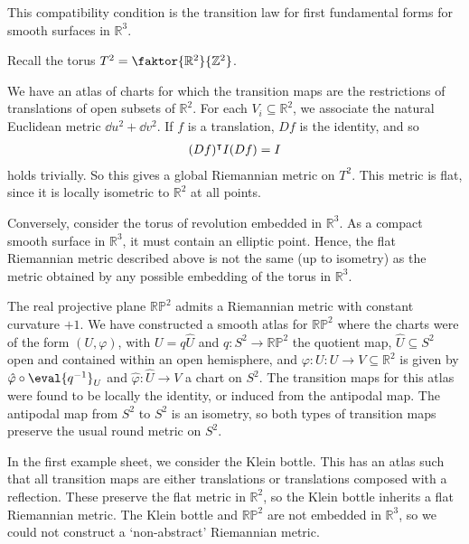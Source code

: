 This compatibility condition is the transition law for first fundamental forms for smooth surfaces in $\mathbb R^3$.
\begin{example}
	Recall the torus $T^2 = \faktor{\mathbb R^2}{\mathbb Z^2}$.
	\begin{center}
	\end{center}
	We have an atlas of charts for which the transition maps are the restrictions of translations of open subsets of $\mathbb R^2$.
	For each $V_i \subseteq \mathbb R^2$, we associate the natural Euclidean metric $\dd{u}^2 + \dd{v}^2$.
	If $f$ is a translation, $Df$ is the identity, and so
	\begin{align*}
		(Df)^\intercal I (Df) = I
	\end{align*}
	holds trivially.
	So this gives a global Riemannian metric on $T^2$.
	This metric is flat, since it is locally isometric to $\mathbb R^2$ at all points.

	Conversely, consider the torus of revolution embedded in $\mathbb R^3$.
	As a compact smooth surface in $\mathbb R^3$, it must contain an elliptic point.
	Hence, the flat Riemannian metric described above is not the same (up to isometry) as the metric obtained by any possible embedding of the torus in $\mathbb R^3$.

	The real projective plane $\mathbb R \mathbb P^2$ admits a Riemannian metric with constant curvature $+1$.
	We have constructed a smooth atlas for $\mathbb R \mathbb P^2$ where the charts were of the form $(U, \varphi)$, with $U = q \hat U$ and $q \colon S^2 \to \mathbb R \mathbb P^2$ the quotient map, $\hat U \subseteq S^2$ open and contained within an open hemisphere, and $\varphi \colon U \colon U \to V \subseteq \mathbb R^2$ is given by $\hat \varphi \circ \eval{q^{-1}}_U$ and $\hat \varphi \colon \hat U \to V$ a chart on $S^2$.
	The transition maps for this atlas were found to be locally the identity, or induced from the antipodal map.
	The antipodal map from $S^2$ to $S^2$ is an isometry, so both types of transition maps preserve the usual round metric on $S^2$.

	In the first example sheet, we consider the Klein bottle.
	This has an atlas such that all transition maps are either translations or translations composed with a reflection.
	These preserve the flat metric in $\mathbb R^2$, so the Klein bottle inherits a flat Riemannian metric.
	The Klein bottle and $\mathbb R \mathbb P^2$ are not embedded in $\mathbb R^3$, so we could not construct a `non-abstract' Riemannian metric.
\end{example}
